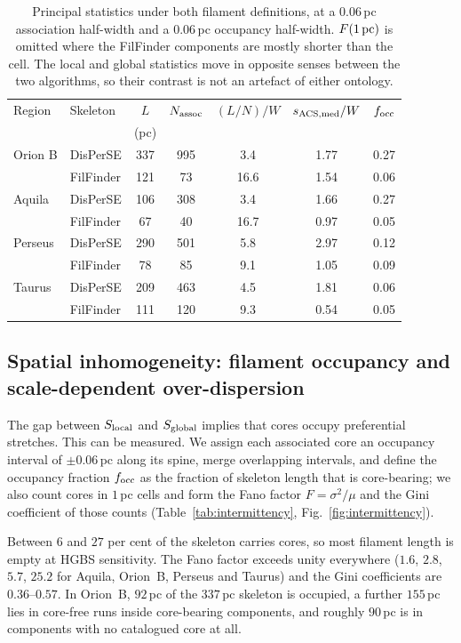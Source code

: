 \documentclass[usenatbib,twoside,twocolumn]{mnras}
\begin{document}
\begin{table}
\caption{Principal statistics under both filament definitions, at a $0.06$\,pc association half-width and a $0.06$\,pc occupancy half-width. $F(1\,{\rm pc})$ is omitted where the FilFinder components are mostly shorter than the cell. The local and global statistics move in opposite senses between the two algorithms, so their contrast is not an artefact of either ontology.}
\label{tab:ontology}
\footnotesize
\setlength{\tabcolsep}{3pt}
\begin{tabular}{llccccc}
\toprule
Region & Skeleton & $L$ & $N_{\rm assoc}$ & $(L/N)/W$ & $s_{\rm ACS,med}/W$ & $f_{\rm occ}$ \\
 & & (pc) & & & & \\
\midrule
Orion B & DisPerSE  & 337 & 995 & 3.4 & 1.77 & 0.27 \\
        & FilFinder & 121 &  73 & 16.6 & 1.54 & 0.06 \\
Aquila  & DisPerSE  & 106 & 308 & 3.4 & 1.66 & 0.27 \\
        & FilFinder &  67 &  40 & 16.7 & 0.97 & 0.05 \\
Perseus & DisPerSE  & 290 & 501 & 5.8 & 2.97 & 0.12 \\
        & FilFinder &  78 &  85 &  9.1 & 1.05 & 0.09 \\
Taurus  & DisPerSE  & 209 & 463 & 4.5 & 1.81 & 0.06 \\
        & FilFinder & 111 & 120 &  9.3 & 0.54 & 0.05 \\
\bottomrule
\end{tabular}
\end{table}

\subsection{Spatial inhomogeneity: filament occupancy and scale-dependent over-dispersion}
\label{sec:intermittency}

The gap between $S_{\rm local}$ and $S_{\rm global}$ implies that cores occupy preferential stretches. This can be measured. We assign each associated core an occupancy interval of $\pm0.06$\,pc along its spine, merge overlapping intervals, and define the occupancy fraction $f_{\rm occ}$ as the fraction of skeleton length that is core-bearing; we also count cores in $1$\,pc cells and form the Fano factor $F=\sigma^2/\mu$ and the Gini coefficient of those counts (Table~\ref{tab:intermittency}, Fig.~\ref{fig:intermittency}).

Between $6$ and $27$ per cent of the skeleton carries cores, so most filament length is empty at HGBS sensitivity. The Fano factor exceeds unity everywhere ($1.6$, $2.8$, $5.7$, $25.2$ for Aquila, Orion~B, Perseus and Taurus) and the Gini coefficients are $0.36$--$0.57$. In Orion~B, $92$\,pc of the $337$\,pc skeleton is occupied, a further $155$\,pc lies in core-free runs inside core-bearing components, and roughly $90$\,pc is in components with no catalogued core at all.
\end{document}
